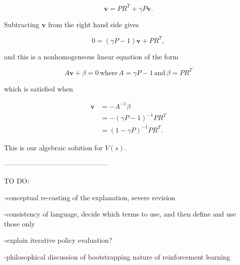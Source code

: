 \documentclass[12pt]{article}
\begin{document}
\begin{equation}
\mathbf{v} = P R^T + \gamma P \mathbf{v}.
\end{equation}

Subtracting $\mathbf{v}$ from the right hand side gives

\begin{equation}
0 = (\gamma P - 1)\mathbf{v} + P R^T,
\end{equation}

and this is a nonhomogeneous linear equation of the form

\begin{equation}
A \mathbf{v} + \beta = 0 \, \mbox{where} \, A = \gamma P - 1 \, \mbox{and} \, \beta = P R^T
\end{equation}

which is satisfied when

\begin{align}
\mathbf{v} &= -A^{-1} \beta \\[5pt]
&= -(\gamma P - 1)^{-1} P R^T \\[5pt]
&= (1 - \gamma P)^{-1} P R^T.
\end{align}

This is our algebraic solution for $V(s)$.

---------------------------------------------

TO DO:

-conceptual re-casting of the explanation, severe revision

-consistency of language, decide which terms to use, and then define and use those only

-explain iterative policy evaluation?

-philosophical discussion of bootstrapping nature of reinforcement learning
\end{document}

